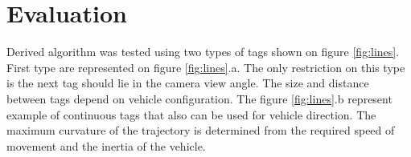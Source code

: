 \documentclass[a4paper,12pt]{article} %
\begin{document}
\newpage

\section*{Evaluation}

Derived algorithm was tested using two types of tags shown on figure \ref{fig:lines}. First type are represented on figure \ref{fig:lines}.a. The only restriction on this type is the next tag should lie in the camera view angle. The size and distance between tags depend on vehicle configuration. The figure \ref{fig:lines}.b represent example of continuous tags that also can be used for vehicle direction. The maximum curvature of the trajectory is determined from the required speed of movement and the inertia of the vehicle. 

\begin{figure}
	\begin{minipage}[h]{0.49\linewidth}

\end{minipage}
\end{figure}
\end{document}
